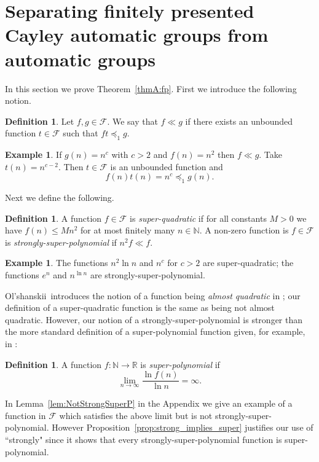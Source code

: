 \documentclass[11pt]{amsart}
\newcommand{\preceqF}{\preceq_1}
\newcommand\Olshan{Ol'shanskii}
\theoremstyle{definition}
\newtheorem{definition}[theorem]{Definition}
\newtheorem{example}[theorem]{Example}
\newcommand\N{\mathbb N}
\newcommand\R{\mathbb R}
\newcommand\F{\mathcal F}
\begin{document}
\section{Separating finitely presented Cayley automatic groups from automatic groups}\label{sec:FP}




In this section we prove Theorem~\ref{thmA:fp}.
First
we  introduce the following  notion.

\begin{definition}
	Let  $f,g\in \F$.
	We say that
	$f \ll g $
	if there exists an unbounded
	function $t \in \F$ such that $ft \preceqF g$. 	
\end{definition}

\begin{example}
If $g(n)=n^c$ with $c>2$ and $f(n)=n^2$ then $f\ll g$.
Take $t(n)=n^{c-2}$.  Then $t \in \F$ is an unbounded function and \[f(n)t(n) = n^c \preceqF g(n).\]
\end{example}

Next we define the following.

\begin{definition}\label{defn:strong-super}
     	A function $f\in \F$ is
{\em  super-quadratic} if for all constants
 	$M > 0$ we have $f(n) \leqslant M n^2$
 	for at most finitely many $n \in \mathbb{N}$.
    A non-zero function is $f\in \F$ is {\em  strongly-super-polynomial} if $n^2f\ll f$.
\end{definition}


\begin{example}
The functions $n^2\ln n$ and  $n^c$ for $c>2$ are super-quadratic;  the functions $e^n$ and  $n^{\ln n}$ are strongly-super-polynomial.
\end{example}

\Olshan\ introduces the notion of a function being {\em almost quadratic} in \cite{Ol-almost}; our definition of a super-quadratic function is the same as being not almost quadratic.
However, our notion of a strongly-super-polynomial is
stronger than the more standard definition of a super-polynomial function given, for example, in \cite{GrigPak}:

\begin{definition}\label{defn:superpoly}
   A function $f:\N\to \R$
   is
   {\em super-polynomial} if $$ \lim_{n \to \infty} \frac{\ln f(n)}{\ln n} = \infty.$$
\end{definition}

In Lemma~\ref{lem:NotStrongSuperP} in the Appendix we give an example of a function in $\F$ which satisfies the above limit but is not strongly-super-polynomial. However  Proposition~\ref{prop:strong_implies_super} justifies our use of ``strongly" since it shows that every strongly-super-polynomial function is super-polynomial.
\end{document}
